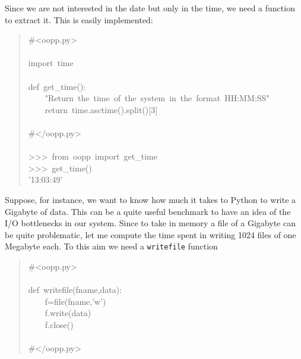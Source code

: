 \documentclass[10pt,english]{article}
\begin{document}
Since we are not interested in the date but only in the time, we need
a function to extract it. This is easily implemented:
\begin{quote}
\begin{ttfamily}\begin{flushleft}
\mbox{{\#}<oopp.py>}\\
\mbox{}\\
\mbox{import~time}\\
\mbox{}\\
\mbox{def~get{\_}time():}\\
\mbox{~~~~"Return~the~time~of~the~system~in~the~format~HH:MM:SS"}\\
\mbox{~~~~return~time.asctime().split()[3]}\\
\mbox{}\\
\mbox{{\#}</oopp.py>}\\
\mbox{}\\
\mbox{>>>~from~oopp~import~get{\_}time}\\
\mbox{>>>~get{\_}time()}\\
\mbox{'13:03:49'}
\end{flushleft}\end{ttfamily}
\end{quote}

Suppose, for instance, we want to know how much it takes to Python
to write a Gigabyte of data. This can be a quite useful benchmark
to have an idea of the I/O bottlenecks in our system. Since to take in memory
a file of a Gigabyte can be quite problematic, let me compute the
time spent in writing 1024 files of one Megabyte each. To this
aim we need a \texttt{writefile} function
\begin{quote}
\begin{ttfamily}\begin{flushleft}
\mbox{{\#}<oopp.py>}\\
\mbox{}\\
\mbox{def~writefile(fname,data):}\\
\mbox{~~~~f=file(fname,'w')}\\
\mbox{~~~~f.write(data)}\\
\mbox{~~~~f.close()}\\
\mbox{}\\
\mbox{{\#}</oopp.py>}
\end{flushleft}\end{ttfamily}
\end{quote}
\end{document}
